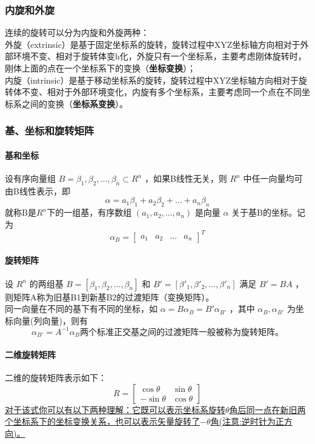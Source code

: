 \documentclass{ctexart}
\begin{document}
	\subsubsection{内旋和外旋}	
	\noindent
	连续的旋转可以分为内旋和外旋两种：
	\\
	外旋（extrinsic）是基于固定坐标系的旋转，旋转过程中XYZ坐标轴方向相对于外部环境不变、相对于旋转体变h化，外旋只有一个坐标系，主要考虑刚体旋转时，刚体上面的点在一个坐标系下的变换（\textbf{坐标变换}）；
	\\
	内旋（intrinsic）是基于移动坐标系的旋转，旋转过程中XYZ坐标轴方向相对于旋转体不变、相对于外部环境变化，内旋有多个坐标系，主要考虑同一个点在不同坐标系之间的变换（\textbf{坐标系变换}）。
	\subsubsection{基、坐标和旋转矩阵}
	\paragraph{基和坐标}
	设有序向量组 $B={\beta_1,\beta_2,...,\beta_n} \subset R^n$ ，如果B线性无关，则 $R^n$ 中任一向量均可由B线性表示，即
	\begin{equation}
	\alpha=a_1 \beta_1 + a_2 \beta_2 + ... + a_n \beta_n
	\end{equation}
	就称B是$R^n$下的一组基，有序数组 $(a_1,a_2,...,a_n)$ 是向量 $\alpha$ 关于基B的坐标。记为
	\begin{equation}
	\alpha_B =
	\begin{bmatrix}
	a_1 & a_2 & ... & a_n
	\end{bmatrix}^T
	\end{equation}
	\paragraph{旋转矩阵}
	设 $R^n$ 的两组基 $B=[\beta_1,\beta_2,...,\beta_n]$ 和 $B'=[\beta '_1,\beta '_2,...,\beta '_n]$ 满足 $B' = B A$ ，则矩阵A称为旧基B1到新基B2的过渡矩阵（变换矩阵）。
	\\
	同一向量在不同的基下有不同的坐标，如 $ \alpha = B \alpha_{B} = B' \alpha_{B'}$ ，其中 $\alpha_{B},\alpha_{B'}$ 为坐标向量(列向量)，则有
	\begin{equation}
	\alpha_{B'} = A^{-1} \alpha_{B}
	两个标准正交基之间的过渡矩阵一般被称为旋转矩阵。
	\end{equation}
	\paragraph{二维旋转矩阵}
	二维的旋转矩阵表示如下：
	\begin{equation}
	R =
	\begin{bmatrix}
	\cos \theta & \sin \theta \\
	-\sin \theta & \cos \theta
	\end{bmatrix}
	\end{equation}
	\uline{对于该式你可以有以下两种理解：它既可以表示坐标系旋转$\theta$角后同一点在新旧两个坐标系下的坐标变换关系，也可以表示矢量旋转了$-\theta$角(注意:逆时针为正方向)。}
\end{document}
